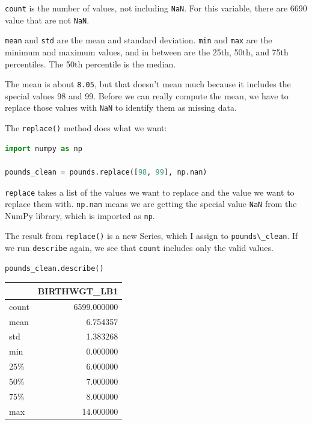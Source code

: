 \passthrough{\lstinline!count!} is the number of values, not including
\passthrough{\lstinline!NaN!}. For this variable, there are 6690 value
that are not \passthrough{\lstinline!NaN!}.

\passthrough{\lstinline!mean!} and \passthrough{\lstinline!std!} are the
mean and standard deviation. \passthrough{\lstinline!min!} and
\passthrough{\lstinline!max!} are the minimum and maximum values, and in
between are the 25th, 50th, and 75th percentiles. The 50th percentile is
the median.

The mean is about \passthrough{\lstinline!8.05!}, but that doesn't mean
much because it includes the special values 98 and 99. Before we can
really compute the mean, we have to replace those values with
\passthrough{\lstinline!NaN!} to identify them as missing data.

The \passthrough{\lstinline!replace()!} method does what we want:

\begin{lstlisting}[language=Python,style=source]
import numpy as np

pounds_clean = pounds.replace([98, 99], np.nan)
\end{lstlisting}

\passthrough{\lstinline!replace!} takes a list of the values we want to
replace and the value we want to replace them with.
\passthrough{\lstinline!np.nan!} means we are getting the special value
\passthrough{\lstinline!NaN!} from the NumPy library, which is imported
as \passthrough{\lstinline!np!}.

The result from \passthrough{\lstinline!replace()!} is a new Series,
which I assign to \passthrough{\lstinline!pounds\_clean!}. If we run
\passthrough{\lstinline!describe!} again, we see that
\passthrough{\lstinline!count!} includes only the valid values.

\begin{lstlisting}[language=Python,style=source]
pounds_clean.describe()
\end{lstlisting}

\begin{tabular}{lr}
\toprule
{} &  BIRTHWGT\_LB1 \\
\midrule
count &   6599.000000 \\
mean  &      6.754357 \\
std   &      1.383268 \\
min   &      0.000000 \\
25\%   &      6.000000 \\
50\%   &      7.000000 \\
75\%   &      8.000000 \\
max   &     14.000000 \\
\bottomrule
\end{tabular}

